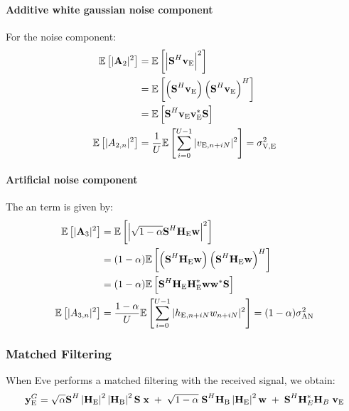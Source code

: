 \paragraph*{Additive white gaussian noise component}
For the noise component:
\begin{subequations}
    \begin{align}
        \mathbb{E} \left[|\textbf{A}_{2}|^2\right] &=  \mathbb{E} \left[\left|\textbf{S}^H \textbf{v}_{\text{E}}\right|^2\right] \\
        &= \mathbb{E} \left[\left(\textbf{S}^H \textbf{v}_{\text{E}} \right)\left(\textbf{S}^H \textbf{v}_{\text{E}} \right)^H\right] \\
        &=\mathbb{E} \left[\textbf{S}^H \textbf{v}_{\text{E}} \textbf{v}_{\text{E}}^* \textbf{S} \right] \\
        \mathbb{E} \left[|A_{2,n}|^2\right] &= \frac{1}{U} \mathbb{E} \left[\sum_{i=0}^{U-1} |v_{\text{E}, n + iN}|^2\right] = \sigma^2_{\text{V,E}}
    \end{align}
    \label{eq:appA:noise_eve_filt0}
\end{subequations}

\paragraph*{Artificial noise component}
The \gls{an} term is given by:
\begin{subequations}
    \begin{align}
        \mathbb{E} \left[|\textbf{A}_{3}|^2\right] &=  \mathbb{E} \left[\left|\sqrt{1-\alpha}\textbf{S}^H \textbf{H}_{\text{E}} \textbf{w}\right|^2\right] \\
        &= (1-\alpha)\mathbb{E} \left[\left(\textbf{S}^H \textbf{H}_{\text{E}} \textbf{w} \right)\left(\textbf{S}^H \textbf{H}_{\text{E}}\textbf{w} \right)^H\right] \\
        &=(1-\alpha)\mathbb{E} \left[\textbf{S}^H \textbf{H}_{\text{E}}\textbf{H}^*_{\text{E}} \textbf{w}\textbf{w}^* \textbf{S} \right] \\
        \mathbb{E} \left[|A_{3,n}|^2\right]  &= \frac{1-\alpha}{U} \mathbb{E} \left[\sum_{i=0}^{U-1} |h_{\text{E}, n + iN}w_{n + iN}|^2\right] = (1-\alpha)\sigma^2_{\text{AN}}
    \end{align}
    \label{eq:appA:an_eve_filt0}
\end{subequations}



\subsubsection{Matched Filtering}
When Eve performs a matched filtering with the received signal, we obtain:
\begin{equation}
    \textbf{y}_{\text{E}}^G = \sqrt{\alpha} \textbf{S}^H \left|\textbf{H}_{\text{E}}\right|^2 \left|\textbf{H}_{\text{B}}\right|^2 \textbf{S}\; \textbf{x} \; +  \; \sqrt{1-\alpha} \; \textbf{S}^H \textbf{H}_{\text{B}}\left|\textbf{H}_{\text{E}}\right|^2 \textbf{w}  \; +  \; \textbf{S}^H  \textbf{H}^*_E \textbf{H}_B \;\textbf{v}_{\text{E}}
    \label{eq:appA:rx_eve_filt1}
\end{equation}

